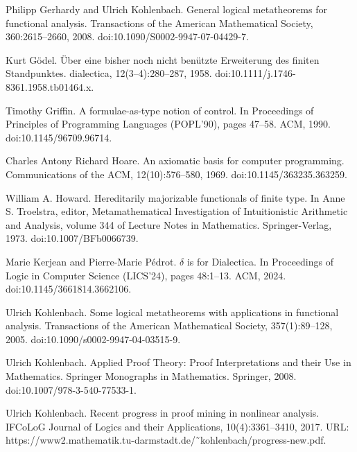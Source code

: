 \documentclass[10pt,a4paper]{article}
\begin{document}
\par\noindent  [11]  Philipp Gerhardy and Ulrich Kohlenbach.  General logical metatheorems for functional analysis.  Transactions of the American Mathematical Society, 360:2615–2660, 2008.  doi:10.1090/S0002-9947-07-04429-7.  
 
\par\noindent  [12]  Kurt Gödel.  Über eine bisher noch nicht benützte Erweiterung des finiten Standpunktes.  dialectica, 12(3–4):280–287, 1958.  doi:10.1111/j.1746-8361.1958.tb01464.x.  
 
\par\noindent  [13]  Timothy Griffin.  A formulae-as-type notion of control.  In Proceedings of Principles of Programming Languages (POPL’90), pages 47–58. ACM, 1990.  doi:10.1145/96709.96714.  
 
\par\noindent  [14]  Charles Antony Richard Hoare.  An axiomatic basis for computer programming.  Communications of the ACM, 12(10):576–580, 1969.  doi:10.1145/363235.363259.  
 
\par\noindent  [15]  William A. Howard.  Hereditarily majorizable functionals of finite type.  In Anne S. Troelstra, editor, Metamathematical Investigation of Intuitionistic Arithmetic and Analysis, volume 344 of Lecture Notes in Mathematics. Springer-Verlag, 1973.  doi:10.1007/BFb0066739.  
 
\par\noindent  [16]  Marie Kerjean and Pierre-Marie Pédrot.  $\delta$ is for Dialectica.  In Proceedings of Logic in Computer Science (LICS’24), pages 48:1–13. ACM, 2024.  doi:10.1145/3661814.3662106.  
 
\par\noindent  [17]  Ulrich Kohlenbach.  Some logical metatheorems with applications in functional analysis.  Transactions of the American Mathematical Society, 357(1):89–128, 2005.  doi:10.1090/s0002-9947-04-03515-9.  
 
\par\noindent  [18]  Ulrich Kohlenbach.  Applied Proof Theory: Proof Interpretations and their Use in Mathematics.  Springer Monographs in Mathematics. Springer, 2008.  doi:10.1007/978-3-540-77533-1.  
 
\par\noindent  [19]  Ulrich Kohlenbach.  Recent progress in proof mining in nonlinear analysis.  IFCoLoG Journal of Logics and their Applications, 10(4):3361–3410, 2017.  URL: https://www2.mathematik.tu-darmstadt.de/˜kohlenbach/progress-new.pdf.  
 
\end{document}
